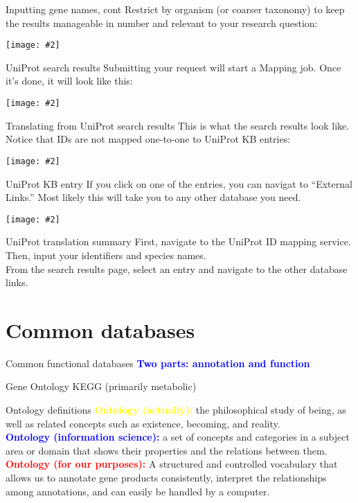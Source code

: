 \documentclass{beamer}
\renewcommand{\c}[1]{\begin{center}#1\end{center}}
\newcommand{\blu}[1]{\textcolor{blue}{\textbf{#1}}}
\newcommand{\red}[1]{\textcolor{red}{\textbf{#1}}}
\newcommand{\yel}[1]{\textcolor{yellow}{\textbf{#1}}}
\newcommand{\gr}[2][.95]{\c{\texttt{[image: \#2]}}}
\begin{document}
\begin{frame}{Inputting gene names, cont}
    Restrict by organism (or coarser taxonomy) to keep the results manageable in number and relevant to your research question:
    \gr[0.7]{l7_figs/uniprot3.png}
\end{frame}

\begin{frame}{UniProt search results}
    Submitting your request will start a Mapping job. Once it's done, it will look like this:
    \gr[0.8]{l7_figs/uniprot4.png}
\end{frame}

\begin{frame}{Translating from UniProt search results}
    This is what the search results look like. Notice that IDs are not mapped one-to-one to UniProt KB entries:
    \gr[0.6]{l7_figs/uniprot5.png}
\end{frame}

\begin{frame}{UniProt KB entry}
    If you click on one of the entries, you can navigat to ``External Links.'' Most likely this will take you to any other database you need.
    \gr[0.6]{l7_figs/uniprot6.png}
\end{frame}

\begin{frame}{UniProt translation summary}
    First, navigate to the UniProt ID mapping service.\\
    \bigskip
    Then, input your identifiers and species names.\\
    \bigskip
    From the search results page, select an entry and navigate to the other database links.
\end{frame}

\section{Common databases}

\begin{frame}{Common functional databases}
    \blu{Two parts: annotation and function}\\
    \bigskip
    \begin{outline}
        \1 Gene Ontology
        \1 KEGG (primarily metabolic)
    \end{outline}
\end{frame}

\begin{frame}{Ontology definitions}
    \yel{Ontology (actually):} the philosophical study of being, as well as related concepts such as existence, becoming, and reality.\\
    \bigskip
    \blu{Ontology (information science):} a set of concepts and categories in a subject area or domain that shows their properties and the relations between them.\\
    \bigskip
    \red{Ontology (for our purposes):} A structured and controlled vocabulary that allows us to annotate gene products consistently, interpret the relationships among annotations, and can easily be handled by a computer.
\end{frame}
\end{document}
